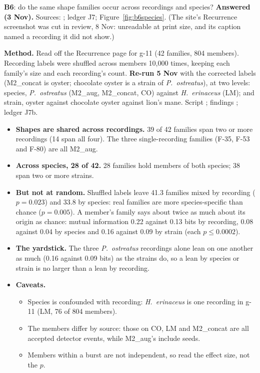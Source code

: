\begin{instructions}
\textbf{B6}: do the same shape families occur across recordings and species? \textbf{Answered (3 Nov).}
Sources: ; ledger J7;
Figure~\ref{fig:b6species}. (The site's Recurrence screenshot was cut in review, 8 Nov: unreadable at print size, and
its caption named a recording it did not show.)

\textbf{Method.} Read off the Recurrence page for g-11 (42 families, 804 members). Recording labels were shuffled
across members 10,000 times, keeping each family's size and each recording's count. \textbf{Re-run 5 Nov} with the
corrected labels (M2\_concat is oyster; chocolate oyster is a strain of \emph{P.\ ostreatus}), at two levels: species,
\emph{P.\ ostreatus} (M2\_aug, M2\_concat, CO) against \emph{H.\ erinaceus} (LM); and strain, oyster against
chocolate oyster against lion's mane. Script ; findings
; ledger J7b.
\begin{itemize}
  \item \textbf{Shapes are shared across recordings.} 39 of 42 families span two or more recordings (14 span all four).
        The three single-recording families (F-35, F-53 and F-80) are all M2\_aug.
  \item \textbf{Across species, 28 of 42.} 28 families hold members of both species; 38 span two or more strains.
  \item \textbf{But not at random.} Shuffled labels leave 41.3 families mixed by recording ($p=0.023$) and 33.8 by
        species: real families are more species-specific than chance ($p=0.005$). A member's family says about twice
        as much about its origin as chance: mutual information 0.22 against 0.13 bits by recording, 0.08 against 0.04
        by species and 0.16 against 0.09 by strain (each $p\le0.0002$).
  \item \textbf{The yardstick.} The three \emph{P.\ ostreatus} recordings alone lean on one another as much
        (0.16 against 0.09 bits) as the strains do, so a lean by species or strain is no larger than a lean by
        recording.
  \item \textbf{Caveats.}
        \begin{itemize}
          \item Species is confounded with recording: \emph{H.\ erinaceus} is one recording in g-11 (LM, 76 of 804
                members).
          \item The members differ by source: those on CO, LM and M2\_concat are all accepted detector events, while
                M2\_aug's include seeds.
          \item Members within a burst are not independent, so read the effect size, not the $p$.
        \end{itemize}
\end{itemize}


\end{instructions}
